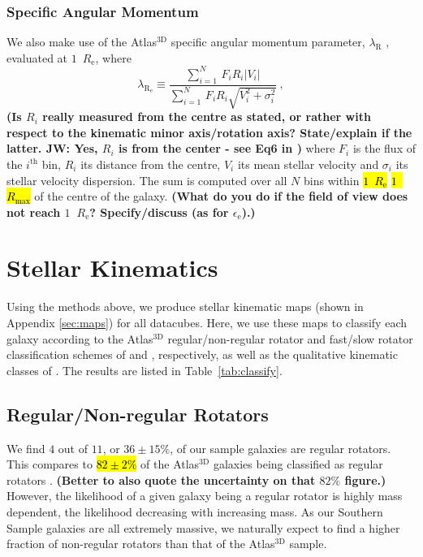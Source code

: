 \documentclass[a4paper,fleqn,usenatbib]{mnras}
\DeclareRobustCommand{\removed}[1]{{\sethlcolor{red}\hl{#1}}}
\DeclareRobustCommand{\added}[1]{{\sethlcolor{green}\hl{#1}}}
\begin{document}
\subsubsection{Specific Angular Momentum}
\label{subsubsec:SpecificMomentum}

We also make use of the Atlas$^\text{3D}$ specific angular momentum
parameter, $\lambda_\text{R}$ \citep{Emsellem2007}, evaluated at
$1$~$R_\text{e}$, where
\begin{equation}
  \lambda_\mathrm{R_e}\equiv\frac{\sum_{i=1}^{N}\,F_iR_i|V_i|}{\sum_{i=1}^{N}\,F_iR_i\sqrt{V_i^2+\sigma_i^2}}~,
\end{equation}
{\bf (Is $R_i$ really measured from the centre as stated, or rather
  with respect to the kinematic minor axis/rotation axis?
  State/explain if the latter. JW: Yes, $R_i$ is from the center - see Eq6 in \citep{Emsellem2007})} where $F_i$ is the flux of the
$i^\text{th}$ bin, $R_i$ its distance from the centre, $V_i$ its mean
stellar velocity and $\sigma_i$ its stellar velocity dispersion. The
sum is computed over all $N$ bins within \removed{$1$~$R_\text{e}$} \added{$1$~$R_\text{max}$} of the
centre of the galaxy. {\bf (What do you do if the field of view does
  not reach $1$~$R_\text{e}$? Specify/discuss (as for
  $\epsilon_\text{e}$).)}

\section{Stellar Kinematics}
\label{sec:StarKine}

Using the methods above, we produce stellar kinematic maps (shown in
Appendix \ref{sec:maps}) for all datacubes. Here, we use these maps to
classify each galaxy according to the Atlas$^\text{3D}$
regular/non-regular rotator and fast/slow rotator classification
schemes of \citet{Krajnovic2006} and \citet{Cappellari2016},
respectively, as well as the qualitative kinematic classes of
\citet{Krajnovic2011}.
The results are listed in Table~\ref{tab:classify}.

\subsection{Regular/Non-regular Rotators}
\label{subsec:RR-NRR}

We find $4$ out of $11$, or $36\pm15\%$, of our sample galaxies are
regular rotators. This compares to \added{$82\pm2\%$} of the Atlas$^\text{3D}$
galaxies being classified as regular rotators
\citep{Krajnovic2011}. {\bf (Better to also quote the uncertainty on
  that $82\%$ figure.)} However, the likelihood of a given galaxy
being a regular rotator is highly mass dependent, the likelihood
decreasing with increasing mass. As our Southern Sample galaxies are
all extremely massive, we naturally expect to find a higher fraction
of non-regular rotators than that of the Atlas$^\text{3D}$ sample.
\end{document}
